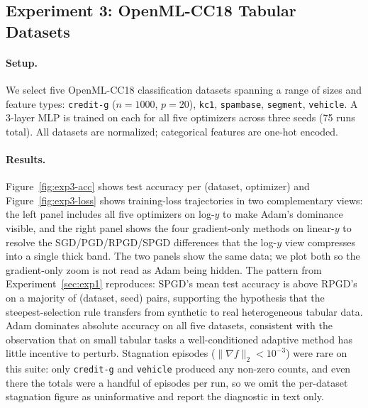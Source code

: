 \documentclass[11pt]{article}
\begin{document}

\subsection{Experiment 3: OpenML-CC18 Tabular Datasets}
\label{sec:exp3}

\paragraph{Setup.} We select five OpenML-CC18 classification datasets
spanning a range of sizes and feature types: \texttt{credit-g}
($n{=}1000$, $p{=}20$), \texttt{kc1}, \texttt{spambase},
\texttt{segment}, \texttt{vehicle}. A 3-layer MLP is trained on each
for all five optimizers across three seeds (75 runs total). All
datasets are normalized; categorical features are one-hot encoded.

\paragraph{Results.} Figure~\ref{fig:exp3-acc} shows test accuracy per
(dataset, optimizer) and Figure~\ref{fig:exp3-loss} shows training-loss
trajectories in two complementary views: the left panel includes all
five optimizers on log-$y$ to make Adam's dominance visible, and the
right panel shows the four gradient-only methods on linear-$y$ to
resolve the SGD/PGD/RPGD/SPGD differences that the log-$y$ view
compresses into a single thick band. The two panels show the same
data; we plot both so the gradient-only zoom is not read as Adam being
hidden. The pattern from Experiment~\ref{sec:exp1}
reproduces: SPGD's mean test accuracy is above RPGD's on a majority of
(dataset, seed) pairs, supporting the hypothesis that the
steepest-selection rule transfers from synthetic to real heterogeneous
tabular data. Adam dominates absolute accuracy on all five datasets,
consistent with the observation that on small tabular tasks a
well-conditioned adaptive method has little incentive to perturb.
Stagnation episodes ($\|\nabla f\|_2 < 10^{-3}$) were rare on this
suite: only \texttt{credit-g} and \texttt{vehicle} produced any
non-zero counts, and even there the totals were a handful of episodes
per run, so we omit the per-dataset stagnation figure as
uninformative and report the diagnostic in text only.
\end{document}
